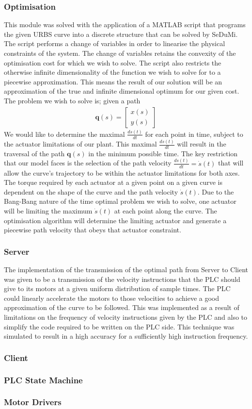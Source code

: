 \subsubsection{Optimisation}
This module was solved with the application of a MATLAB script that programs the given URBS curve into a discrete structure that can be solved by SeDuMi. The script performs a change of variables in order to linearise the physical constraints of the system. The change of variables retains the convexity of the optimisation cost for which we wish to solve. The script also restricts the otherwise infinite dimensionality of the function we wish to solve for to a piecewise approximation. This means the result of our solution will be an approximation of the true and infinite dimensional optimum for our given cost. 
The problem we wish to solve is; given a path 
\begin{align*}
\textbf{q}(s) = 
\begin{bmatrix}
  x(s)\\
  y(s)
 \end{bmatrix}
\end{align*}
We would like to determine the maximal $\frac{ds(t)}{dt}$ for each point in time, subject to the actuator limitations of our plant. This maximal $\frac{ds(t)}{dt}$ will result in the traversal of the path $\textbf{q}(s)$ in the minimum possible time. The key restriction that our model faces is the selection of the path velocity $\frac{ds(t)}{dt} = \dot{s}(t)$ that will allow the curve's trajectory to be within the actuator limitations for both axes. The torque required by each actuator at a given point on a given curve is dependent on the shape of the curve and the path velocity $\dot{s}(t)$. Due to the Bang-Bang nature of the time optimal problem we wish to solve, one actuator will be limiting the maximum $\dot{s}(t)$ at each point along the curve. The optimisation algorithm will determine the limiting actuator and generate a piecewise path velocity that obeys that actuator constraint.

\subsubsection{Server}
The implementation of the transmission of the optimal path from Server to Client was given to be a transmission of the velocity instructions that the PLC should give to its motors at a given uniform distribution of sample times. The PLC could linearly accelerate the motors to those velocities to achieve a good approximation of the curve to be followed. This was implemented as a result of limitations on the frequency of velocity instructions given by the PLC and also to simplify the code required to be written on the PLC side. This technique was simulated to result in a high accuracy for a sufficiently high instruction frequency.

\subsubsection{Client}
\subsubsection{PLC State Machine}
\subsubsection{Motor Drivers}



